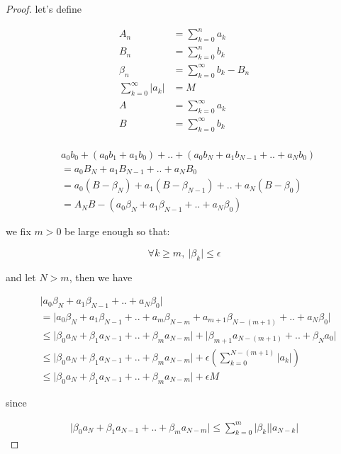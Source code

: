 \begin{proof}
    let's define

    \begin{align*}
        A_n &= \sum_{k=0}^{n}a_k \\
        B_n &= \sum_{k=0}^{n}b_k \\
        \beta_n &= \sum_{k=0}^{\infty}b_k - B_n \\
        \sum_{k=0}^{\infty}\lvert a_k \rvert &= M \\
        A &= \sum_{k=0}^{\infty}a_k \\
        B &= \sum_{k=0}^{\infty}b_k \\
    \end{align*}

    \begin{align*}
        & a_0b_0 + (a_0b_1 + a_1b_0) + .. + (a_0b_N + a_1b_{N-1} + .. + a_Nb_0) \\
        & = a_0B_N + a_1B_{N-1} + .. + a_NB_0 \\
        &= a_0(B - \beta_N) + a_1(B-\beta_{N-1}) + .. + a_N(B-\beta_{0}) \\
        &= A_NB - \left( a_0\beta_N + a_1 \beta_{N-1} + .. + a_N\beta_{0}\right)
    \end{align*}    

    we fix $m > 0$ be large enough so that:

    \[
        \forall k \ge m,\: \lvert \beta_k \rvert \le \epsilon
    \]

    
    and let $N > m$, then we have

    \begin{align*}
        & \lvert a_0\beta_N + a_1 \beta_{N-1} + .. + a_N\beta_{0} \rvert \\
        & = \lvert a_0\beta_N + a_1 \beta_{N-1} + .. + a_m\beta_{N-m} + a_{m+1}\beta_{N-(m+1)} + .. + a_N\beta_{0} \rvert \\
        & \le \lvert \beta_0a_N + \beta_1 a_{N-1} + .. + \beta_ma_{N-m} \rvert + \lvert \beta_{m+1}a_{N-(m+1)} + .. + \beta_Na_{0} \rvert \\
        & \le \lvert \beta_0a_N + \beta_1 a_{N-1} + .. + \beta_ma_{N-m} \rvert + \epsilon \left(\sum_{k=0}^{N-(m+1)}\lvert a_k \rvert \right) \\
        & \le \lvert \beta_0a_N + \beta_1 a_{N-1} + .. + \beta_ma_{N-m} \rvert + \epsilon M
    \end{align*}

    since

    \begin{align*}
        \lvert \beta_0a_N + \beta_1 a_{N-1} + .. + \beta_ma_{N-m} \rvert \le \sum_{k=0}^{m} \lvert \beta_k \rvert \lvert a_{N-k}\rvert
    \end{align*}


\end{proof}
